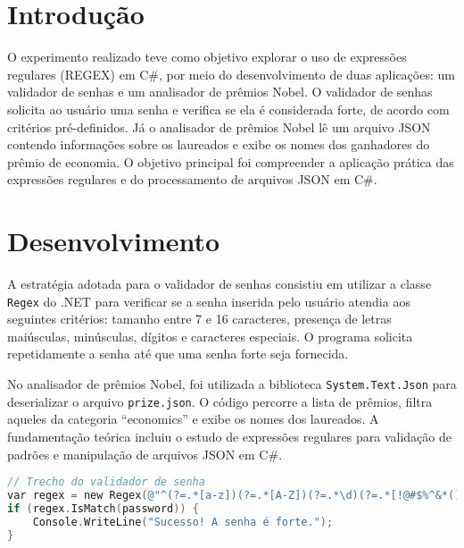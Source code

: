 \documentclass[
	12pt,				%
	oneside,			%
	a4paper,			%
	english,			%
	brazil,				%
	]{abntex2}
\begin{document}
\frenchspacing 

\imprimircapa

{
\ABNTEXchapterfont

\textual

\section{Introdução}

O experimento realizado teve como objetivo explorar o uso de expressões regulares (REGEX) em C\#, por meio do desenvolvimento de duas aplicações: um validador de senhas e um analisador de prêmios Nobel. O validador de senhas solicita ao usuário uma senha e verifica se ela é considerada forte, de acordo com critérios pré-definidos. Já o analisador de prêmios Nobel lê um arquivo JSON contendo informações sobre os laureados e exibe os nomes dos ganhadores do prêmio de economia. O objetivo principal foi compreender a aplicação prática das expressões regulares e do processamento de arquivos JSON em C\#.

\section{Desenvolvimento}

A estratégia adotada para o validador de senhas consistiu em utilizar a classe \texttt{Regex} do .NET para verificar se a senha inserida pelo usuário atendia aos seguintes critérios: tamanho entre 7 e 16 caracteres, presença de letras maiúsculas, minúsculas, dígitos e caracteres especiais. O programa solicita repetidamente a senha até que uma senha forte seja fornecida.

No analisador de prêmios Nobel, foi utilizada a biblioteca \texttt{System.Text.Json} para deserializar o arquivo \texttt{prize.json}. O código percorre a lista de prêmios, filtra aqueles da categoria ``economics'' e exibe os nomes dos laureados. A fundamentação teórica incluiu o estudo de expressões regulares para validação de padrões e manipulação de arquivos JSON em C\#.

\begin{lstlisting}[language=C]
// Trecho do validador de senha
var regex = new Regex(@"^(?=.*[a-z])(?=.*[A-Z])(?=.*\d)(?=.*[!@#$%^&*()+=_\-{}\[\]:;""'?<>,.]).{7,16}$");
if (regex.IsMatch(password)) {
    Console.WriteLine("Sucesso! A senha é forte.");
}


\end{lstlisting}}
\end{document}
